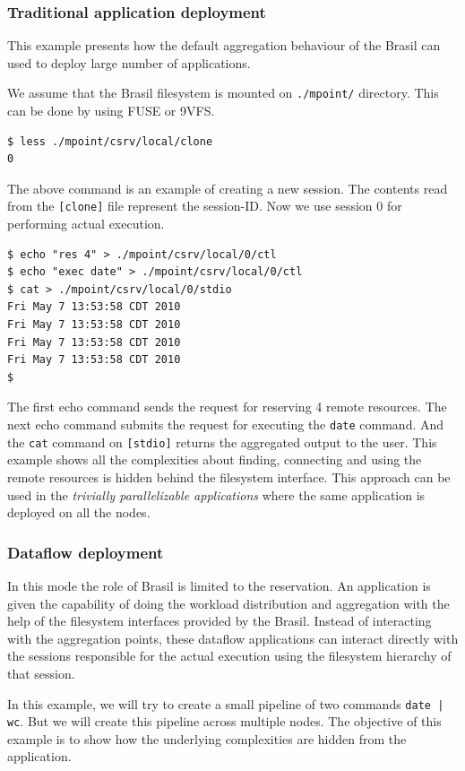 \documentclass[conference]{sig-alternate}
\begin{document}
\subsubsection{Traditional application deployment}
This example presents how the default aggregation behaviour of the Brasil can
used to deploy large number of applications.

We assume that the Brasil filesystem is mounted on \texttt{./mpoint/} directory. 
This can be done by using FUSE or 9VFS\cite{v9fseric}.
\begin{verbatim}
$ less ./mpoint/csrv/local/clone
0 
\end{verbatim}
The above command is an example of creating a new session. The contents read
from the \texttt{[clone]} file represent the session-ID.  Now we use session 0
for performing actual execution.
\begin{verbatim}
$ echo "res 4" > ./mpoint/csrv/local/0/ctl
$ echo "exec date" > ./mpoint/csrv/local/0/ctl
$ cat > ./mpoint/csrv/local/0/stdio
Fri May 7 13:53:58 CDT 2010
Fri May 7 13:53:58 CDT 2010
Fri May 7 13:53:58 CDT 2010
Fri May 7 13:53:58 CDT 2010
$
\end{verbatim}
The first echo command sends the request for reserving 4 remote resources. The
next echo command submits the request for executing the \texttt{date} command.
And the \texttt{cat} command on \texttt{[stdio]} returns the aggregated output
to the user.  This example shows all the complexities about finding, connecting
and using the remote resources is hidden behind the filesystem interface.
This approach can be used in the \textit{trivially parallelizable applications}
where the same application is deployed on all the nodes.

\subsubsection{Dataflow deployment}
In this mode the role of Brasil is limited to the reservation. An application
is given the capability of doing the workload distribution and aggregation
with the help of the filesystem interfaces provided by the Brasil. Instead of
interacting with the aggregation points, these dataflow applications can
interact directly with the sessions responsible for the actual execution using
the filesystem hierarchy of that session.

In this example, we will try to create a small pipeline of two commands
\texttt{date | wc}.  But we will create this pipeline across multiple nodes. 
The objective of this example is to show how the underlying complexities are
hidden from the application.
\end{document}
